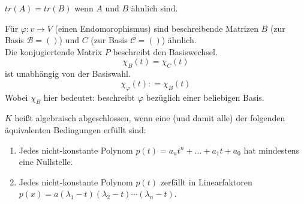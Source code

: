 \documentclass[9pt]{article} %
\begin{document}
\begin{kor}
\(tr(A) = tr(B)\) wenn $A$ und $B$ ähnlich sind. 
\end{kor} 
\begin{kor}
 Für $\varphi: v \rightarrow V$ (einen Endomorophismus) sind beschreibende Matrizen $B$ (zur Basis $\mathcal{B} = ()$) und $C$ (zur Basis  $\mathcal{C} = ()$) ähnlich. \\
 Die konjugiertende Matrix $P$ beschreibt den Basiswechsel. 
 \[
 \chi_B(t) =  \chi_C(t)
 \] ist unabhängig von der Basiswahl. \\
 \[
 \chi_{\varphi}(t) : = \chi_B(t)
 \]
 Wobei $\chi_B$ hier bedeutet: beschreibt $\varphi$ bezüglich einer beliebigen Basis. 
\end{kor}
\begin{defi}
$K$ heißt algebraisch abgeschlossen, wenn eine (und damit alle) der folgenden äquivalenten Bedingungen erfüllt sind: 
\begin{enumerate}
    \item Jedes nicht-konstante Polynom $p(t) = a_n t^n + ... + a_1 t + a_0$  hat mindestens eine Nullstelle. 
    \item Jedes nicht-konstante Polynom $p(t)$ zerfällt in Linearfaktoren $p(x) = a(\lambda_1-t) (\lambda_2 - t) \cdots (\lambda_n -t)$. 
\end{enumerate}
\end{defi}
\end{document}
